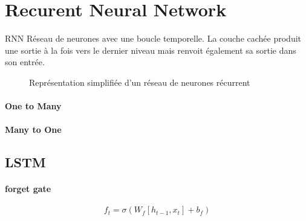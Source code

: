 \section{Recurent Neural Network}

\gls{RNN}
Réseau de neurones avec une boucle temporelle.
La couche cachée produit une sortie à la fois vers le dernier niveau mais renvoit également sa sortie dans son entrée.

\begin{figure}[ht]
	\centering
	\caption{Représentation simplifiée d'un réseau de neurones récurrent}
\end{figure}

\paragraph{One to Many}

\paragraph{Many to One}

\subsection{\gls{LSTM}}

\paragraph{forget gate}
\begin{equation}
	f_t = \sigma(W_f [h_{t-1}, x_t] + b_f)
\end{equation}